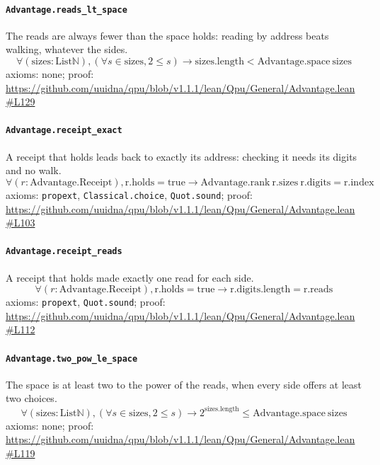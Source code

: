 \documentclass[11pt]{article}
\begin{document}
\paragraph{\texttt{Advantage.reads\_lt\_space}}
The reads are always fewer than the space holds: reading by address beats walking, whatever the sides.
\[ \forall (\mathrm{sizes} : \mathrm{List} \mathbb{N}), (\forall s \in \mathrm{sizes}, 2 \le s) \to \mathrm{sizes.length} < \mathrm{Advantage.space}\ \mathrm{sizes} \]
\noindent axioms: none; proof: \url{https://github.com/uuidna/qpu/blob/v1.1.1/lean/Qpu/General/Advantage.lean\#L129}

\paragraph{\texttt{Advantage.receipt\_exact}}
A receipt that holds leads back to exactly its address: checking it needs its digits and no walk.
\[ \forall (r : \mathrm{Advantage.Receipt}), \mathrm{r.holds} = \mathrm{true} \to \mathrm{Advantage.rank}\ \mathrm{r.sizes}\ \mathrm{r.digits} = \mathrm{r.index} \]
\noindent axioms: \texttt{propext}, \texttt{Classical.choice}, \texttt{Quot.sound}; proof: \url{https://github.com/uuidna/qpu/blob/v1.1.1/lean/Qpu/General/Advantage.lean\#L103}

\paragraph{\texttt{Advantage.receipt\_reads}}
A receipt that holds made exactly one read for each side.
\[ \forall (r : \mathrm{Advantage.Receipt}), \mathrm{r.holds} = \mathrm{true} \to \mathrm{r.digits.length} = \mathrm{r.reads} \]
\noindent axioms: \texttt{propext}, \texttt{Quot.sound}; proof: \url{https://github.com/uuidna/qpu/blob/v1.1.1/lean/Qpu/General/Advantage.lean\#L112}

\paragraph{\texttt{Advantage.two\_pow\_le\_space}}
The space is at least two to the power of the reads, when every side offers at least two choices.
\[ \forall (\mathrm{sizes} : \mathrm{List} \mathbb{N}), (\forall s \in \mathrm{sizes}, 2 \le s) \to 2 ^{\mathrm{sizes.length}} \le \mathrm{Advantage.space}\ \mathrm{sizes} \]
\noindent axioms: none; proof: \url{https://github.com/uuidna/qpu/blob/v1.1.1/lean/Qpu/General/Advantage.lean\#L119}
\end{document}
